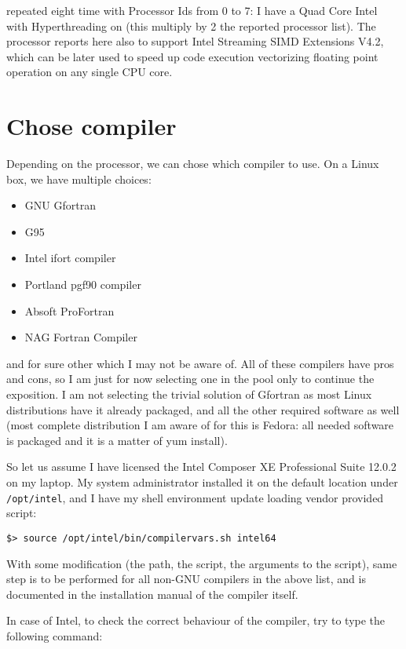 repeated eight time with Processor Ids from 0 to 7: I have a Quad Core Intel
with Hyperthreading on (this multiply by 2 the reported processor list).
The processor reports here also to support Intel Streaming SIMD Extensions V4.2,
which can be later used to speed up code execution vectorizing floating point
operation on any single CPU core.

\section{Chose compiler}

Depending on the processor, we can chose which compiler to use. On a Linux box,
we have multiple choices:

\begin{itemize}
\item GNU Gfortran
\item G95
\item Intel ifort compiler
\item Portland pgf90 compiler
\item Absoft ProFortran
\item NAG Fortran Compiler
\end{itemize}

and for sure other which I may not be aware of. All of these compilers have pros
and cons, so I am just for now selecting one in the pool only to continue the
exposition. I am not selecting the trivial solution of Gfortran as most
Linux distributions have it already packaged, and all the other required
software as well (most complete distribution I am aware of for this is Fedora:
all needed software is packaged and it is a matter of yum install).

So let us assume I have licensed the Intel Composer XE Professional Suite
12.0.2 on my laptop. My system administrator installed it on the default
location under \verb=/opt/intel=, and I have my shell environment update
loading vendor provided script:

\begin{Verbatim}
$> source /opt/intel/bin/compilervars.sh intel64
\end{Verbatim}

With some modification (the path, the script, the arguments to the script),
same step is to be performed for all non-GNU compilers in the above list, and
is documented in the installation manual of the compiler itself.

In case of Intel, to check the correct behaviour of the compiler, try to
type the following command:

